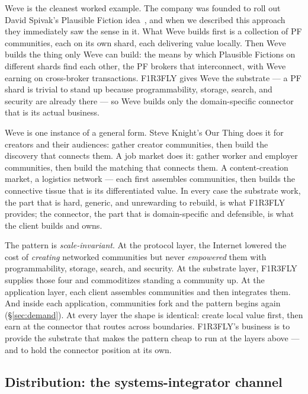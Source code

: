 \documentclass[11pt]{article}
\begin{document}
Weve is the cleanest worked example. The company was founded to roll out David Spivak's Plausible Fiction idea~\cite{pf,pricedPf}, and when we described this approach they immediately saw the sense in it. What Weve builds first is a collection of PF communities, each on its own shard, each delivering value locally. Then Weve builds the thing only Weve can build: the means by which Plausible Fictions on different shards find each other, the PF brokers that interconnect, with Weve earning on cross-broker transactions. F1R3FLY gives Weve the substrate --- a PF shard is trivial to stand up because programmability, storage, search, and security are already there --- so Weve builds only the domain-specific connector that is its actual business.

Weve is one instance of a general form. Steve Knight's Our Thing does it for creators and their audiences: gather creator communities, then build the discovery that connects them. A job market does it: gather worker and employer communities, then build the matching that connects them. A content-creation market, a logistics network --- each first assembles communities, then builds the connective tissue that is its differentiated value. In every case the substrate work, the part that is hard, generic, and unrewarding to rebuild, is what F1R3FLY provides; the connector, the part that is domain-specific and defensible, is what the client builds and owns.

\begin{keybox}
The pattern is \emph{scale-invariant}. At the protocol layer, the Internet lowered the cost of \emph{creating} networked communities but never \emph{empowered} them with programmability, storage, search, and security. At the substrate layer, F1R3FLY supplies those four and commoditizes standing a community up. At the application layer, each client assembles communities and then integrates them. And inside each application, communities fork and the pattern begins again (\S\ref{sec:demand}). At every layer the shape is identical: create local value first, then earn at the connector that routes across boundaries. F1R3FLY's business is to provide the substrate that makes the pattern cheap to run at the layers above --- and to hold the connector position at its own.
\end{keybox}

\subsection*{Distribution: the systems-integrator channel}
\end{document}
